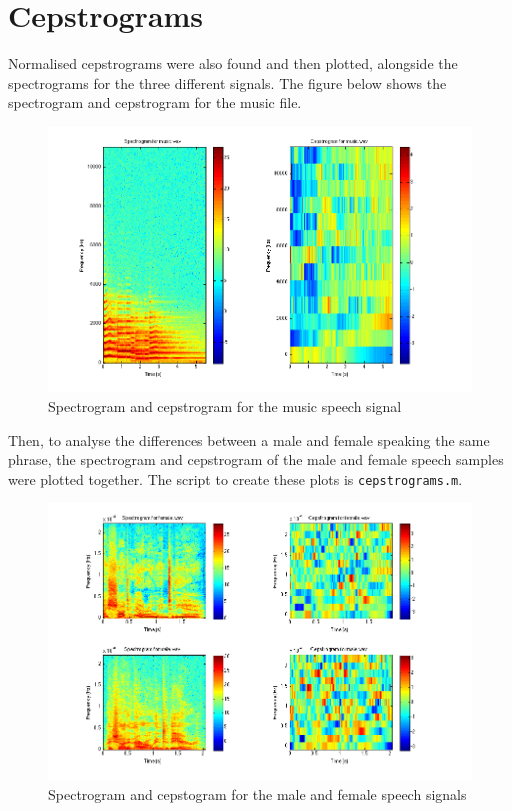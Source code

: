 \documentclass[11pt]{article}   %
\begin{document}
\newpage

\section{Cepstrograms}

Normalised cepstrograms were also found and then plotted, alongside the spectrograms for the three different signals. The figure below shows the spectrogram and cepstrogram for the music file. 

\begin{figure}[H]
\begin{center}
\leavevmode
\includegraphics[width=1\textwidth]{musicCepstro.png}
\end{center}
\caption{Spectrogram and cepstrogram for the music speech signal}
\label{euler:1}
\end{figure}

\newpage
Then, to analyse the differences between a male and female speaking the same phrase, the spectrogram and cepstrogram of the male and female speech samples were plotted together. The script to create these plots is \texttt{cepstrograms.m}.


\begin{figure}[H]
\begin{center}
\leavevmode
\includegraphics[width=1\textwidth]{speechCepstro.png}
\end{center}
\caption{Spectrogram and cepstogram for the male and female speech signals}
\label{euler:1}
\end{figure}
\end{document}
